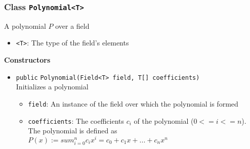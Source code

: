 \subsubsection{Class \lstinline|Polynomial<T>|}
A polynomial $P$ over a field \\


\begin{itemize}
\item \lstinline|<T>|: The type of the field's elements
\end{itemize}


\textbf{Constructors}
\begin{itemize}
\item \lstinline|public| \lstinline|Polynomial|\lstinline|(Field<T> field, T[] coefficients)|\\
Initializes a polynomial
\begin{itemize}
\item \lstinline|field|: An instance of the field over which the polynomial is formed
\item \lstinline|coefficients|: The coefficients $c_i$ of the polynomial ($0 <= i <= n$).
 The polynomial is defined as $P(x) := sum_{i=0}^n c_i x^i = c_0 + c_1
 x + ... + c_n x^n$
\end{itemize}



\end{itemize}


